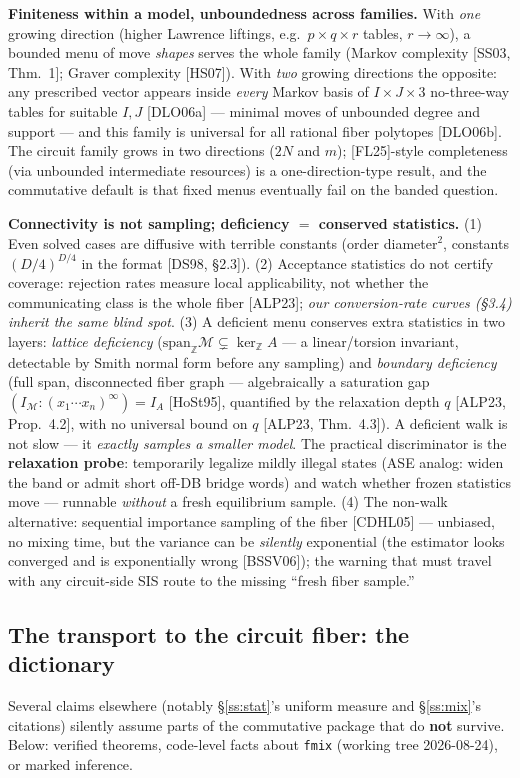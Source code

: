 \documentclass[11pt]{article}
\newcommand{\code}[1]{\texttt{#1}}
\begin{document}
\textbf{Finiteness within a model, unboundedness across families.} With \emph{one} growing direction
(higher Lawrence liftings, e.g.\ $p\times q\times r$ tables, $r\to\infty$), a bounded menu of move
\emph{shapes} serves the whole family (Markov complexity [SS03, Thm.~1]; Graver complexity [HS07]).
With \emph{two} growing directions the opposite: any prescribed vector appears inside \emph{every}
Markov basis of $I\times J\times 3$ no-three-way tables for suitable $I,J$ [DLO06a] --- minimal moves
of unbounded degree and support --- and this family is universal for all rational fiber polytopes
[DLO06b]. The circuit family grows in two directions ($2N$ and $m$); [FL25]-style completeness (via
unbounded intermediate resources) is a one-direction-type result, and the commutative default is that
fixed menus eventually fail on the banded question.

\textbf{Connectivity is not sampling; deficiency $=$ conserved statistics.}
(1) Even solved cases are diffusive with terrible constants (order diameter$^2$, constants
$(D/4)^{D/4}$ in the format [DS98, \S2.3]).
(2) Acceptance statistics do not certify coverage: rejection rates measure local applicability, not
whether the communicating class is the whole fiber [ALP23]; \emph{our conversion-rate curves (\S3.4)
inherit the same blind spot}.
(3) A deficient menu conserves extra statistics in two layers: \emph{lattice deficiency}
($\mathrm{span}_{\mathbb{Z}}\mathcal{M}\subsetneq\ker_{\mathbb{Z}}A$ --- a linear/torsion invariant,
detectable by Smith normal form before any sampling) and \emph{boundary deficiency} (full span,
disconnected fiber graph --- algebraically a saturation gap
$(I_{\mathcal{M}}:(x_1\cdots x_n)^\infty)=I_A$ [HoSt95], quantified by the relaxation depth $q$
[ALP23, Prop.~4.2], with no universal bound on $q$ [ALP23, Thm.~4.3]). A deficient walk is not slow
--- it \emph{exactly samples a smaller model}. The practical discriminator is the \textbf{relaxation
probe}: temporarily legalize mildly illegal states (ASE analog: widen the band or admit short off-DB
bridge words) and watch whether frozen statistics move --- runnable \emph{without} a fresh
equilibrium sample.
(4) The non-walk alternative: sequential importance sampling of the fiber [CDHL05] --- unbiased, no
mixing time, but the variance can be \emph{silently} exponential (the estimator looks converged and
is exponentially wrong [BSSV06]); the warning that must travel with any circuit-side SIS route to the
missing ``fresh fiber sample.''

\subsection{The transport to the circuit fiber: the dictionary}\label{ss:transport}
Several claims elsewhere (notably \S\ref{ss:stat}'s uniform measure and \S\ref{ss:mix}'s citations)
silently assume parts of the commutative package that do \textbf{not} survive. Below: verified
theorems, code-level facts about \code{fmix} (working tree 2026-08-24), or marked inference.
\end{document}
